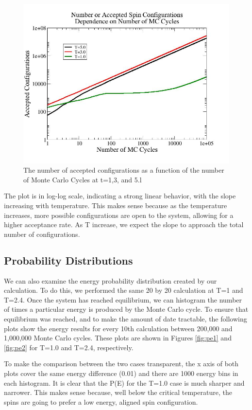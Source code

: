 \documentclass[%
oneside,                 %
final,                   %
10pt]{article}
\begin{document}
\begin{figure}[H]\label{fig:acceptplot}
  \centering
    \includegraphics[width=1.1 \textwidth]{acceptplot.jpg}
    \caption{The number of accepted configurations as a function of the number of Monte Carlo Cycles at t=1,3, and 5.l}
\end{figure}

The plot is in log-log scale, indicating a strong linear behavior, with the slope increasing with temperature.  This makes sense because as the temperature increases, more possible configurations are open to the system, allowing for a higher acceptance rate.  As T increase, we expect the slope to approach the total number of configurations.

\subsection{Probability Distributions}

We can also examine the energy probability distribution created by our calculation.  To do this, we performed the same 20 by 20 calculation at T=1 and T=2.4.  Once the system has reached equilibrium, we can histogram the number of times a particular energy is produced by the Monte Carlo cycle.  To ensure that equilibrium was reached, and to make the amount of date tractable, the following plots show the energy results for every 10th calculation between 200,000 and 1,000,000 Monte Carlo cycles.  These plots are shown in Figures \ref{fig:pe1} and \ref{fig:pe2} for T=1.0 and T=2.4, respectively.

To make the comparison between the two cases transparent, the x axis of both plots cover the same energy difference (0.01) and there are 1000 energy bins in each histogram.  It is clear that the P(E) for the T=1.0 case is much sharper and narrower.  This makes sense because, well below the critical temperature, the spins are going to prefer a low energy, aligned spin configuration.
\end{document}
